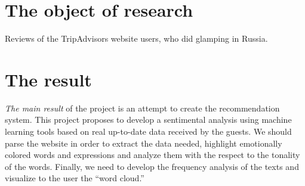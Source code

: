 \documentclass{article}
\begin{document}
\newpage

\section{The object of research}
Reviews of the TripAdvisors website users, who did glamping in Russia.

\section{The result}
\textit{The main result} of the project is an attempt to create the recommendation system. This project proposes to develop a sentimental analysis using machine learning tools based on real up-to-date data received by the guests. We should parse the website in order to extract the data needed, highlight emotionally colored words and expressions and analyze them with the respect to the tonality of the words. Finally, we need to develop the frequency analysis of the texts and visualize to the user the “word cloud.”
\end{document}
